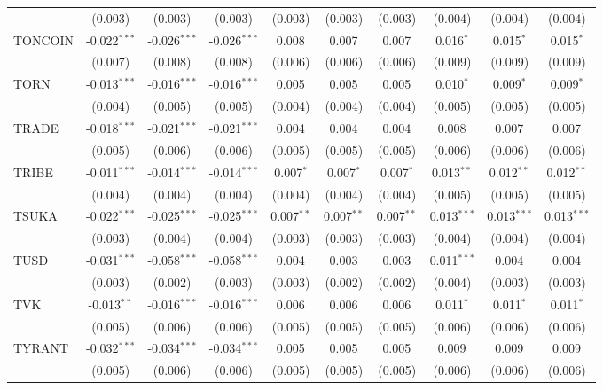 \begin{table}[!htbp]
\begin{tabular}{@{\extracolsep{5pt}}lccccccccc}
  & (0.003) & (0.003) & (0.003) & (0.003) & (0.003) & (0.003) & (0.004) & (0.004) & (0.004) \\
 TONCOIN & -0.022$^{***}$ & -0.026$^{***}$ & -0.026$^{***}$ & 0.008$^{}$ & 0.007$^{}$ & 0.007$^{}$ & 0.016$^{*}$ & 0.015$^{*}$ & 0.015$^{*}$ \\
  & (0.007) & (0.008) & (0.008) & (0.006) & (0.006) & (0.006) & (0.009) & (0.009) & (0.009) \\
 TORN & -0.013$^{***}$ & -0.016$^{***}$ & -0.016$^{***}$ & 0.005$^{}$ & 0.005$^{}$ & 0.005$^{}$ & 0.010$^{*}$ & 0.009$^{*}$ & 0.009$^{*}$ \\
  & (0.004) & (0.005) & (0.005) & (0.004) & (0.004) & (0.004) & (0.005) & (0.005) & (0.005) \\
 TRADE & -0.018$^{***}$ & -0.021$^{***}$ & -0.021$^{***}$ & 0.004$^{}$ & 0.004$^{}$ & 0.004$^{}$ & 0.008$^{}$ & 0.007$^{}$ & 0.007$^{}$ \\
  & (0.005) & (0.006) & (0.006) & (0.005) & (0.005) & (0.005) & (0.006) & (0.006) & (0.006) \\
 TRIBE & -0.011$^{***}$ & -0.014$^{***}$ & -0.014$^{***}$ & 0.007$^{*}$ & 0.007$^{*}$ & 0.007$^{*}$ & 0.013$^{**}$ & 0.012$^{**}$ & 0.012$^{**}$ \\
  & (0.004) & (0.004) & (0.004) & (0.004) & (0.004) & (0.004) & (0.005) & (0.005) & (0.005) \\
 TSUKA & -0.022$^{***}$ & -0.025$^{***}$ & -0.025$^{***}$ & 0.007$^{**}$ & 0.007$^{**}$ & 0.007$^{**}$ & 0.013$^{***}$ & 0.013$^{***}$ & 0.013$^{***}$ \\
  & (0.003) & (0.004) & (0.004) & (0.003) & (0.003) & (0.003) & (0.004) & (0.004) & (0.004) \\
 TUSD & -0.031$^{***}$ & -0.058$^{***}$ & -0.058$^{***}$ & 0.004$^{}$ & 0.003$^{}$ & 0.003$^{}$ & 0.011$^{***}$ & 0.004$^{}$ & 0.004$^{}$ \\
  & (0.003) & (0.002) & (0.003) & (0.003) & (0.002) & (0.002) & (0.004) & (0.003) & (0.003) \\
 TVK & -0.013$^{**}$ & -0.016$^{***}$ & -0.016$^{***}$ & 0.006$^{}$ & 0.006$^{}$ & 0.006$^{}$ & 0.011$^{*}$ & 0.011$^{*}$ & 0.011$^{*}$ \\
  & (0.005) & (0.006) & (0.006) & (0.005) & (0.005) & (0.005) & (0.006) & (0.006) & (0.006) \\
 TYRANT & -0.032$^{***}$ & -0.034$^{***}$ & -0.034$^{***}$ & 0.005$^{}$ & 0.005$^{}$ & 0.005$^{}$ & 0.009$^{}$ & 0.009$^{}$ & 0.009$^{}$ \\
  & (0.005) & (0.006) & (0.006) & (0.005) & (0.005) & (0.005) & (0.006) & (0.006) & (0.006) \\

\end{tabular}
\end{table}
